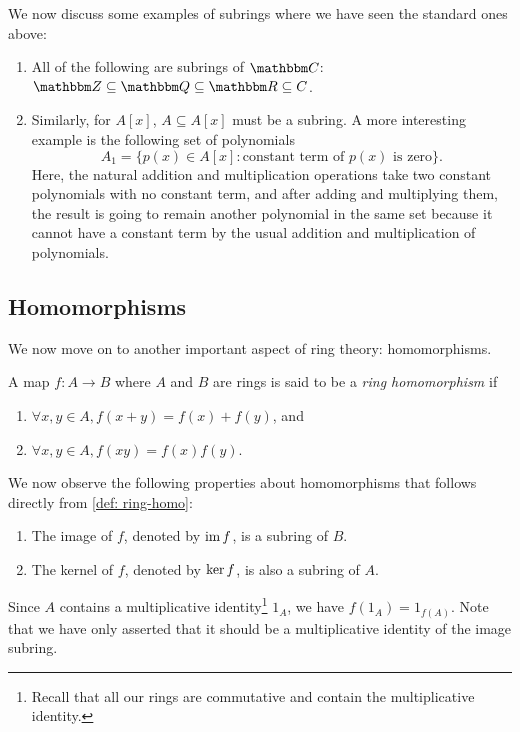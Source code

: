 \begin{example}
    We now discuss some examples of subrings where we have seen the standard ones above:
    \begin{enumerate}
        \item All of the following are subrings of ${\C}$: ${\Z} \subseteq {\Q} \subseteq {\R} \subseteq C$.
        \item Similarly, for $A[x]$, $A \subseteq A[x]$ must be a subring. A more interesting example is the following set of polynomials
        \[A_{1}=\{p(x) \in A[x]\colon \text{constant term of $p(x)$ is zero}\}.\]
        Here, the natural addition and multiplication operations take two constant polynomials with no constant term, and after adding and multiplying them, the result is going to remain another polynomial in the same set because it cannot have a constant term by the usual addition and multiplication of polynomials. 
    \end{enumerate}
    
\end{example} 

\subsection{Homomorphisms}
We now move on to another important aspect of ring theory: homomorphisms. 
\begin{definition}
    \label{def: ring-homo}
    A map $f: A \rightarrow B$ where $A$ and $B$ are rings is said to be a {\it ring homomorphism} if 
    \begin{enumerate}
        \item $\forall x, y \in A, f(x+y)=f(x)+f(y)$, and
        \item $\forall x, y \in A, f(x y)=f(x) f(y)$.
    \end{enumerate}
\end{definition}
\begin{observation}
We now observe the following properties about homomorphisms that follows directly from \cref{def: ring-homo}:
    \begin{enumerate}
        \item\label{item: homo-1} The image of $f$, denoted by $\operatorname{\text{im\/}}{f}$, is a subring of $B$.
        \item\label{item: homo-2} The kernel of $f$, denoted by $\operatorname{\text{ker\/}}{f}$,
        is also a subring of $A$.
    \end{enumerate} 
\end{observation}
Since $A$ contains a multiplicative identity\footnote{Recall that all our rings are commutative and contain the multiplicative identity.} $1_A$, we have $f\left(1_{A}\right)=1_{f(A)}$. Note that we have only asserted that it should be a multiplicative identity of the image subring. 



